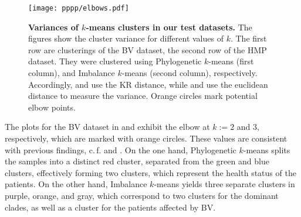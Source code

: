 \begin{figure}[hpbt!]
    \centering
    \texttt{[image: pppp/elbows.pdf]}
    \begin{subfigure}{0pt}
        \label{fig:elbows:sub:bv_phylo}
    \end{subfigure}
    \begin{subfigure}{0pt}
        \label{fig:elbows:sub:bv_imb}
    \end{subfigure}
    \begin{subfigure}{0pt}
        \label{fig:elbows:sub:hmp_phylo}
    \end{subfigure}
    \begin{subfigure}{0pt}
        \label{fig:elbows:sub:hmp_imb}
    \end{subfigure}
    \caption[Variances of $k$-means clusters in our test datasets]{
        \textbf{Variances of $k$-means clusters in our test datasets.}
        The figures show the cluster variance for different values of $k$.
        The first row are clusterings of the BV dataset, the second row of the HMP dataset.
        They were clustered using Phylogenetic $k$-means (first column),
        and Imbalance $k$-means (second column), respectively.
        Accordingly,  and  use the KR distance,
        while  and  use the euclidean distance
        to measure the variance.
        Orange circles mark potential elbow points.
    }
    \label{fig:elbows}
\end{figure}

The plots for the \ac{BV} dataset in  and 
exhibit the elbow at $k:=2$ and $3$, respectively, which are marked with orange circles.
These values are consistent with previous findings, c.\,f.  and .
On the one hand, Phylogenetic $k$-means splits the samples into a distinct red cluster,
separated from the green and blue clusters,
effectively forming two clusters, which represent the health status of the patients.
On the other hand, Imbalance $k$-means yields three separate clusters in purple, orange, and gray,
which correspond to two clusters for the dominant  clades,
as well as a cluster for the patients affected by \ac{BV}.

